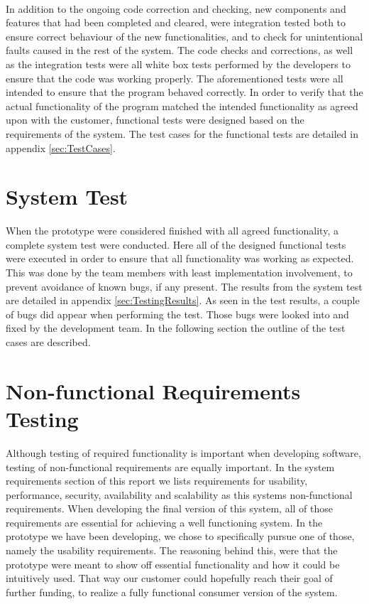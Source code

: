 \paragraph{} In addition to the ongoing code correction and checking, new components and features that had been completed and cleared, were integration tested both to ensure correct behaviour of the new functionalities, and to check for unintentional faults caused in the rest of the system. The code checks and corrections, as well as the integration tests were all white box tests performed by the developers to ensure that the code was working properly. The aforementioned tests were all intended to ensure that the program behaved correctly. In order to verify that the actual functionality of the program matched the intended functionality as agreed upon with the customer, functional tests were designed based on the requirements of the system. The test cases for the functional tests are detailed in appendix \ref{sec:TestCases}.

\section{System Test}
\label{sec:TestingSystem}

When the prototype were considered finished with all agreed functionality, a complete system test were conducted. Here all of the designed functional tests were executed  in order to ensure that all functionality was working as expected. This was done by the team members with least implementation involvement, to prevent avoidance of known bugs, if any present. The results from the system test are detailed in appendix \ref{sec:TestingResults}. As seen in the test results, a couple of bugs did appear when performing the test. Those bugs were looked into and fixed by the development team. In the following section the outline of the test cases are described.

\section{Non-functional Requirements Testing}
\label{sec:TestingNRT}

Although testing of required functionality is important when developing software, testing of non-functional requirements are equally important. In the system requirements section of this report we lists requirements for usability, performance, security, availability and scalability as this systems non-functional requirements. When developing the final version of this system, all of those requirements are essential for achieving a well functioning system. In the prototype we have been developing, we chose to specifically pursue one of those, namely the usability requirements. The reasoning behind this, were that the prototype were meant to show off essential functionality and how it could be intuitively used. That way our customer could hopefully reach their goal of further funding, to realize a fully functional consumer version of the system. 

